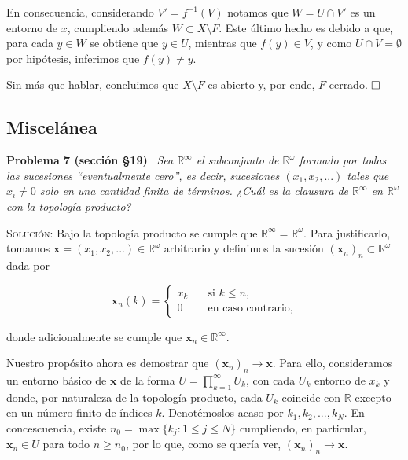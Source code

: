 \documentclass[11pt]{article}
\begin{document}
\begin{itemize}
    En consecuencia, considerando $V' = f^{-1}(V)$ notamos que $W = U \cap V'$ es un entorno de $x$, cumpliendo además $W \subset X \setminus F$. Este último hecho es debido a que, para cada $y \in W$ se obtiene que $y \in U$, mientras que $f(y) \in V$, y como $U \cap V = \emptyset$ por hipótesis, inferimos que $f(y) \neq y$.

    Sin más que hablar, concluimos que $X \setminus F$ es abierto y, por ende, $F$ cerrado. $\hfill\square$
\end{itemize}

\subsection{Miscelánea}

\noindent\textbf{Problema 7 (sección \S 19)} \, \textit{Sea $\mathbb{R}^{\infty}$ el subconjunto de $\mathbb{R}^{\omega}$ formado por todas las sucesiones ``eventualmente cero'', es decir, sucesiones $(x_1, x_2, ...)$ tales que $x_i \neq 0$ solo en una cantidad finita de términos. ¿Cuál es la clausura de $\mathbb{R}^{\infty}$ en $\mathbb{R}^{\omega}$ con la topología producto?}

\medskip

\noindent\textsc{Solución}: Bajo la topología producto se cumple que $\overline{\mathbb{R}^{\infty}} = \mathbb{R}^{\omega}$. Para justificarlo, tomamos $\mathbf{x} = (x_1, x_2, ...) \in \mathbb{R}^{\omega}$ arbitrario y definimos la sucesión $(\mathbf{x}_n)_n \subset \mathbb{R}^{\omega}$ dada por

\begin{equation*}
    \mathbf{x}_n(k) = \begin{cases}
        x_k \quad & \text{si $k \leq n$}, \\
        0 & \text{en caso contrario,}
    \end{cases}
\end{equation*}

\noindent donde adicionalmente se cumple que $\mathbf{x}_n \in \mathbb{R}^{\infty}$.

Nuestro propósito ahora es demostrar que $(\mathbf{x}_n)_n \to \mathbf{x}$. Para ello, consideramos un entorno básico de $\mathbf{x}$ de la forma $U = \prod_{k=1}^{\infty} U_k$, con cada $U_k$ entorno de $x_k$ y donde, por naturaleza de la topología producto, cada $U_k$ coincide con $\mathbb{R}$ excepto en un número finito de índices $k$. Denotémoslos acaso por $k_1, k_2, ..., k_N$. En concescuencia, existe $n_0 = \max\{k_j : 1 \leq j \leq N\}$ cumpliendo, en particular, $\mathbf{x}_n \in U$ para todo $n \geq n_0$, por lo que, como se quería ver, $(\mathbf{x}_n)_n \to \mathbf{x}$. 
\end{document}
